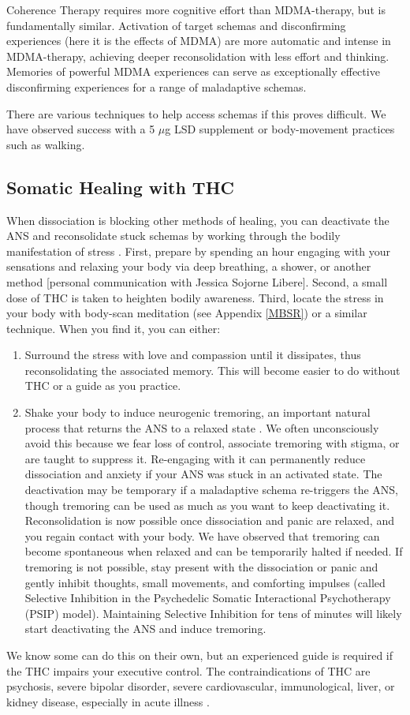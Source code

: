\documentclass[12pt,letterpaper]{article}
\begin{document}
Coherence Therapy requires more cognitive effort than MDMA-therapy, but is fundamentally similar. Activation of target schemas and disconfirming experiences (here it is the effects of MDMA) are more automatic and intense in MDMA-therapy, achieving deeper reconsolidation with less effort and thinking. Memories of powerful MDMA experiences can serve as exceptionally effective disconfirming experiences for a range of maladaptive schemas.

There are various techniques to help access schemas if this proves difficult. We have observed success with a 5 $\mu$g LSD supplement or body-movement practices such as walking.
\subsection{Somatic Healing with THC}
\label{psip}
When dissociation is blocking other methods of healing, you can deactivate the ANS and reconsolidate stuck schemas by working through the bodily manifestation of stress \cite{razviPSIP}. First, prepare by spending an hour engaging with your sensations and relaxing your body via deep breathing, a shower, or another method [personal communication with Jessica Sojorne Libere]. Second, a small dose of THC is taken to heighten bodily awareness. Third, locate the stress in your body with body-scan meditation (see Appendix \ref{MBSR}) or a similar technique. When you find it, you can either:
\begin{enumerate}
    \item Surround the stress with love and compassion until it dissipates, thus reconsolidating the associated memory. This will become easier to do without THC or a guide as you practice.
    \item Shake your body to induce neurogenic tremoring, an important natural process that returns the ANS to a relaxed state \cite{berceliTremor,razviPSIP}. We often unconsciously avoid this because we fear loss of control, associate tremoring with stigma, or are taught to suppress it. Re-engaging with it can permanently reduce dissociation and anxiety if your ANS was stuck in an activated state. The deactivation may be temporary if a maladaptive schema re-triggers the ANS, though tremoring can be used as much as you want to keep deactivating it. Reconsolidation is now possible once dissociation and panic are relaxed, and you regain contact with your body. We have observed that tremoring can become spontaneous when relaxed and can be temporarily halted if needed. If tremoring is not possible, stay present with the dissociation or panic and gently inhibit thoughts, small movements, and comforting impulses (called Selective Inhibition in the Psychedelic Somatic Interactional Psychotherapy (PSIP) model). Maintaining Selective Inhibition for tens of minutes will likely start deactivating the ANS and induce tremoring.
\end{enumerate}
We know some can do this on their own, but an experienced guide is required if the THC impairs your executive control. The contraindications of THC are psychosis, severe bipolar disorder, severe cardiovascular, immunological, liver, or kidney disease, especially in acute illness \cite{DCCannabis}.
\end{document}
